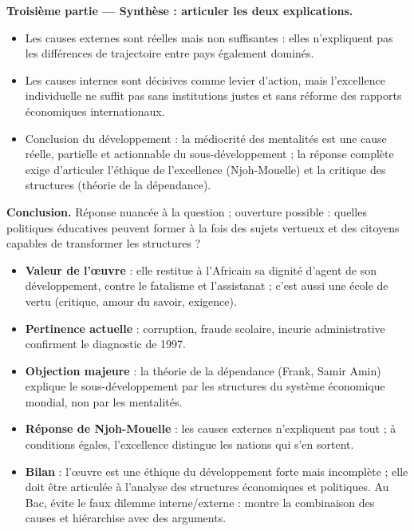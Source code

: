 \documentclass[11pt]{article}
\begin{document}
\begin{exoresolu}
\textbf{Troisième partie — Synthèse : articuler les deux explications.}
\begin{itemize}
\item Les causes externes sont réelles mais non suffisantes : elles n'expliquent pas les différences de trajectoire entre pays également dominés.
\item Les causes internes sont décisives comme levier d'action, mais l'excellence individuelle ne suffit pas sans institutions justes et sans réforme des rapports économiques internationaux.
\item Conclusion du développement : la médiocrité des mentalités est une cause réelle, partielle et actionnable du sous-développement ; la réponse complète exige d'articuler l'éthique de l'excellence (Njoh-Mouelle) et la critique des structures (théorie de la dépendance).
\end{itemize}

\textbf{Conclusion.} Réponse nuancée à la question ; ouverture possible : quelles politiques éducatives peuvent former à la fois des sujets vertueux et des citoyens capables de transformer les structures ?
\end{exoresolu}

\begin{aretenir}
\begin{itemize}
\item \textbf{Valeur de l'œuvre} : elle restitue à l'Africain sa dignité d'agent de son développement, contre le fatalisme et l'assistanat ; c'est aussi une école de vertu (critique, amour du savoir, exigence).
\item \textbf{Pertinence actuelle} : corruption, fraude scolaire, incurie administrative confirment le diagnostic de 1997.
\item \textbf{Objection majeure} : la théorie de la dépendance (Frank, Samir Amin) explique le sous-développement par les structures du système économique mondial, non par les mentalités.
\item \textbf{Réponse de Njoh-Mouelle} : les causes externes n'expliquent pas tout ; à conditions égales, l'excellence distingue les nations qui s'en sortent.
\item \textbf{Bilan} : l'œuvre est une éthique du développement forte mais incomplète ; elle doit être articulée à l'analyse des structures économiques et politiques. Au Bac, évite le faux dilemme interne/externe : montre la combinaison des causes et hiérarchise avec des arguments.
\end{itemize}
\end{aretenir}
\end{document}

